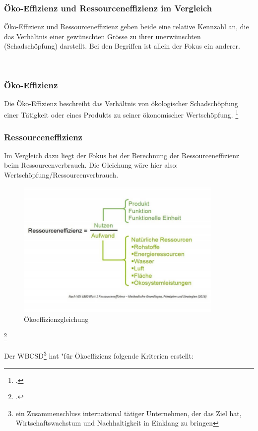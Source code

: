 \documentclass{scrartcl}
\begin{document}
        
\subsubsection{Öko-Effizienz und Ressourceneffizienz im Vergleich}

Öko-Effizienz und Ressourceneffizienz geben beide eine relative Kennzahl an, die das Verhältnis einer gewünschten Grösse zu ihrer unerwünschten (Schadschöpfung) darstellt. Bei den Begriffen ist allein der Fokus ein anderer.

\\
\subsubsection{Öko-Effizienz}
Die Öko-Effizienz beschreibt das Verhältnis von ökologischer Schadschöpfung einer Tätigkeit oder eines Produkts zu seiner ökonomischer Wertschöpfung. \footcite[Vgl.][]{Schaltegger1990OkologischeUnternehmung} 

\subsubsection{Ressourceneffizienz}
Im Vergleich dazu liegt der Fokus bei der Berechnung der  Ressourceneffizienz beim Ressourcenverbrauch. Die Gleichung wäre hier also: Wertschöpfung/Ressourcenverbrauch.

\begin{figure}[htbp]
\centering
\includegraphics[width=10cm]{image_folder/ressourceneffizienz.jpg}
\caption{Ökoeffizienzgleichung}
\label{fig:Ökoeffizienzgleichung}
\end{figure}\footcite{Essel2010AnalyseFazit}

   
 Der WBCSD\footnote{ein Zusammenschluss international tätiger Unternehmen, der das Ziel hat, Wirtschaftswachstum und Nachhaltigkeit in Einklang zu bringen} hat "für Ökoeffizienz folgende Kriterien erstellt: 
 
\end{document}

